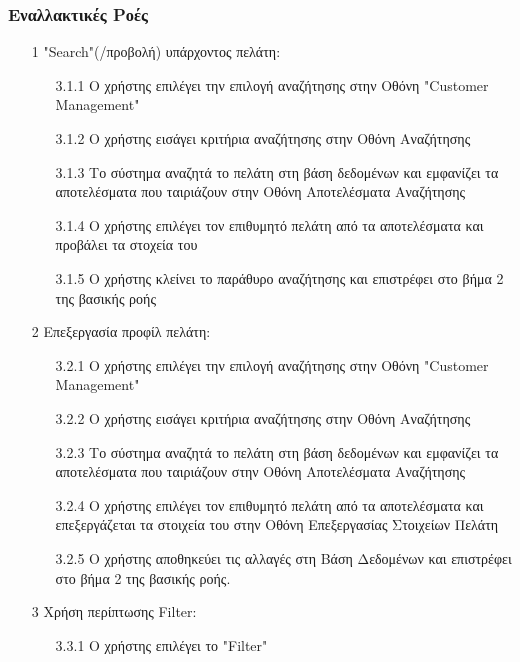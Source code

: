 \documentclass[12pt,a4paper,twoside]{book}
\begin{document}
\subsubsection{Εναλλακτικές Ροές}
\begin{enumerate}
  \item[1 ] "Search"(/προβολή) υπάρχοντος πελάτη: %
        \begin{enumerate}
          \item[3.1.1 ] Ο χρήστης επιλέγει την επιλογή αναζήτησης στην Οθόνη "Customer Management" %
          \item[3.1.2 ] Ο χρήστης εισάγει κριτήρια αναζήτησης στην Οθόνη Αναζήτησης %
          \item[3.1.3 ] Το σύστημα αναζητά το πελάτη στη βάση δεδομένων και εμφανίζει τα αποτελέσματα που ταιριάζουν στην Οθόνη Αποτελέσματα Αναζήτησης %
          \item[3.1.4 ] Ο χρήστης επιλέγει τον επιθυμητό πελάτη από τα αποτελέσματα και προβάλει τα στοχεία του
          \item[3.1.5 ] Ο χρήστης κλείνει το παράθυρο αναζήτησης και επιστρέφει στο βήμα 2 της βασικής ροής
        \end{enumerate}
  \item[2 ] Επεξεργασία προφίλ πελάτη:
        \begin{enumerate}
          \item[3.2.1 ] Ο χρήστης επιλέγει την επιλογή αναζήτησης στην Οθόνη "Customer Management" %
          \item[3.2.2 ] Ο χρήστης εισάγει κριτήρια αναζήτησης στην Οθόνη Αναζήτησης %
          \item[3.2.3 ] Το σύστημα αναζητά το πελάτη στη βάση δεδομένων και εμφανίζει τα αποτελέσματα που ταιριάζουν στην Οθόνη Αποτελέσματα Αναζήτησης %
          \item[3.2.4 ] Ο χρήστης επιλέγει τον επιθυμητό πελάτη από τα αποτελέσματα και επεξεργάζεται τα στοιχεία του στην Οθόνη Επεξεργασίας Στοιχείων Πελάτη %
          \item[3.2.5 ] Ο χρήστης αποθηκεύει τις αλλαγές στη Βάση Δεδομένων και επιστρέφει στο βήμα 2 της βασικής ροής. %
        \end{enumerate}
  \item[3 ] Χρήση περίπτωσης Filter:
        \begin{enumerate}
          \item[3.3.1 ] Ο χρήστης επιλέγει το "Filter"  %

\end{enumerate}
\end{enumerate}
\end{document}
